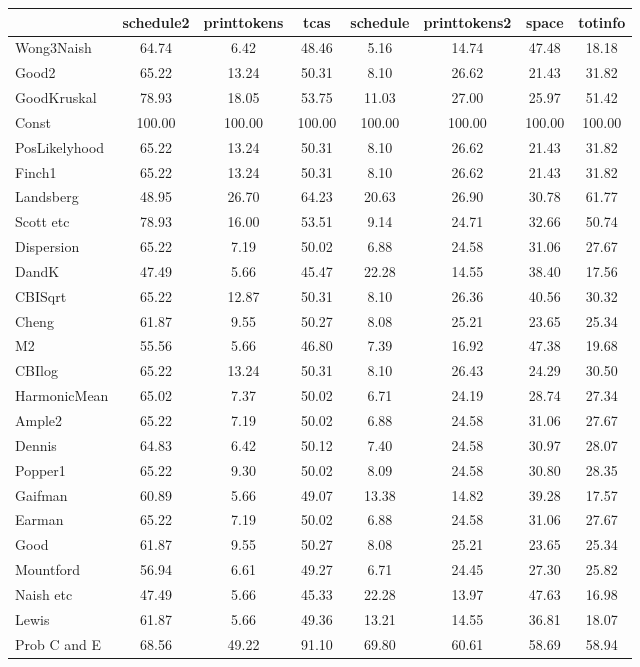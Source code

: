 \begin{tabular}{l||c|c|c|c|c|c|c}
& schedule2& printtokens& tcas& schedule& printtokens2& space& totinfo\\
\hline\hline
Wong3Naish& 64.74& 6.42& 48.46& 5.16& 14.74& 47.48& 18.18\\
Good2& 65.22& 13.24& 50.31& 8.10& 26.62& 21.43& 31.82\\
GoodKruskal& 78.93& 18.05& 53.75& 11.03& 27.00& 25.97& 51.42\\
Const& 100.00& 100.00& 100.00& 100.00& 100.00& 100.00& 100.00\\
PosLikelyhood& 65.22& 13.24& 50.31& 8.10& 26.62& 21.43& 31.82\\
Finch1& 65.22& 13.24& 50.31& 8.10& 26.62& 21.43& 31.82\\
Landsberg& 48.95& 26.70& 64.23& 20.63& 26.90& 30.78& 61.77\\
Scott etc& 78.93& 16.00& 53.51& 9.14& 24.71& 32.66& 50.74\\
Dispersion& 65.22& 7.19& 50.02& 6.88& 24.58& 31.06& 27.67\\
DandK& 47.49& 5.66& 45.47& 22.28& 14.55& 38.40& 17.56\\
CBISqrt& 65.22& 12.87& 50.31& 8.10& 26.36& 40.56& 30.32\\
Cheng& 61.87& 9.55& 50.27& 8.08& 25.21& 23.65& 25.34\\
M2& 55.56& 5.66& 46.80& 7.39& 16.92& 47.38& 19.68\\
CBIlog& 65.22& 13.24& 50.31& 8.10& 26.43& 24.29& 30.50\\
HarmonicMean& 65.02& 7.37& 50.02& 6.71& 24.19& 28.74& 27.34\\
Ample2& 65.22& 7.19& 50.02& 6.88& 24.58& 31.06& 27.67\\
Dennis& 64.83& 6.42& 50.12& 7.40& 24.58& 30.97& 28.07\\
Popper1& 65.22& 9.30& 50.02& 8.09& 24.58& 30.80& 28.35\\
Gaifman& 60.89& 5.66& 49.07& 13.38& 14.82& 39.28& 17.57\\
Earman& 65.22& 7.19& 50.02& 6.88& 24.58& 31.06& 27.67\\
Good& 61.87& 9.55& 50.27& 8.08& 25.21& 23.65& 25.34\\
Mountford& 56.94& 6.61& 49.27& 6.71& 24.45& 27.30& 25.82\\
Naish etc& 47.49& 5.66& 45.33& 22.28& 13.97& 47.63& 16.98\\
Lewis& 61.87& 5.66& 49.36& 13.21& 14.55& 36.81& 18.07\\
Prob C and E& 68.56& 49.22& 91.10& 69.80& 60.61& 58.69& 58.94\\

\end{tabular}
